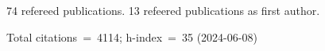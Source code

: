 74 refereed publications. 13 refeered publications as first author.

Total citations~=~4114; h-index~=~35 (2024-06-08)